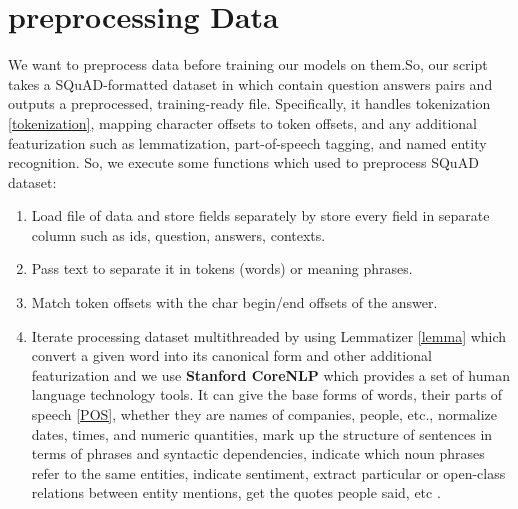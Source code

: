 \section{preprocessing Data}
We want to preprocess data before training our models on them.So, our script takes a SQuAD-formatted dataset in which contain question answers pairs and outputs a preprocessed, training-ready file. Specifically, it handles tokenization \ref{tokenization}, mapping character offsets to token offsets, and any additional featurization such as lemmatization, part-of-speech tagging, and named entity recognition.
So, we execute some functions which used to preprocess SQuAD dataset:
\begin{enumerate}
     
    \item Load file of data and store fields separately by store every field in separate column such as ids, question, answers, contexts.
    \item Pass text to separate it in tokens (words) or meaning phrases.
    \item Match token offsets with the char begin/end offsets of the answer.
    \item Iterate processing dataset multithreaded by using Lemmatizer \ref{lemma} which  convert a given word into its canonical form and other additional featurization and we use \textbf{Stanford CoreNLP} which provides a set of human language technology tools. It can give the base forms of words, their parts of speech \ref{POS}, whether they are names of companies, people, etc., normalize dates, times, and numeric quantities, mark up the structure of sentences in terms of phrases and syntactic dependencies, indicate which noun phrases refer to the same entities, indicate sentiment, extract particular or open-class relations between entity mentions, get the quotes people said, etc \cite{manning-EtAl:2014:P14-5}.
\end{enumerate}   
